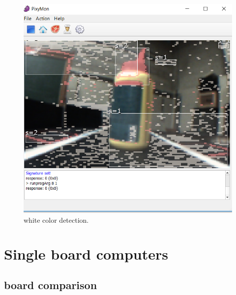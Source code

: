 \documentclass[english]{book_template} %
\begin{document}
\begin{figure}[H]
\center
\caption{white color detection.\label{fig:whitecolor}}
\includegraphics[scale=0.5]{./img/whitecolor}
\end{figure} 







\chapter{Single board computers}
\section{board comparison}
\end{document}
